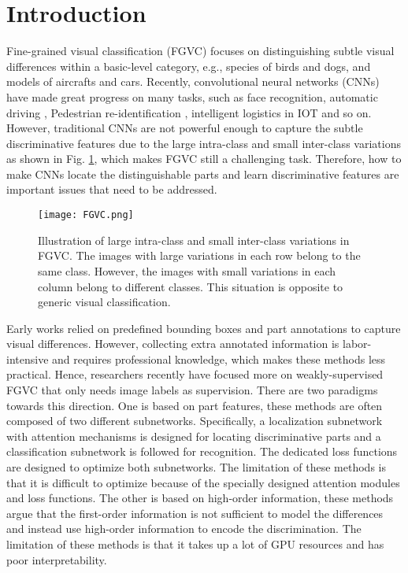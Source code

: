 \documentclass[conference]{IEEEtran}
\begin{document}
	\section{Introduction}
	Fine-grained visual classification (FGVC) focuses on distinguishing subtle visual
	differences within a basic-level category, e.g., species of birds\cite{CUB} and dogs\cite{DOG}, and models of aircrafts\cite{CRAFT} and cars\cite{CAR}.
	Recently, convolutional neural networks (CNNs) have made great progress on many tasks, such as face recognition\cite{facenet}, automatic driving \cite{self-drive},
	Pedestrian re-identification \cite{Part-Pool}, intelligent logistics in IOT and so on.
	However, traditional CNNs are not powerful enough to capture the subtle discriminative features due to the large intra-class and small inter-class variations as shown in Fig. \ref{fig:fgvc}, which makes FGVC still a challenging task. Therefore, how to make CNNs locate the distinguishable parts and learn discriminative features are important issues that need to be addressed.
	\begin{figure}[htbp]
		\centerline{\texttt{[image: FGVC.png]}}
		\caption{Illustration of large intra-class and small inter-class variations in FGVC. The images with large variations in each row belong to the same class. However, the images with small variations in each column belong to different classes. This situation is opposite to generic visual classification.}
		\label{fig:fgvc}
	\end{figure}
	Early works \cite{Part-RCNN}\cite{Deep-LAC}\cite{Part-SCNN}\cite{Pose-Norm} relied on predefined bounding boxes and part annotations to capture visual differences. However, collecting extra annotated information is labor-intensive and requires professional knowledge, which makes these methods less practical. Hence, researchers recently have focused more on weakly-supervised FGVC that only needs image labels as supervision. There are two paradigms towards this direction. One is based on part features, these methods  \cite{RA-CNN}\cite{FDL}\cite{NTS}\cite{MGE}\cite{S3N} are often composed of two different subnetworks. Specifically, a localization subnetwork with attention mechanisms is designed for locating discriminative parts and a classification subnetwork is followed for recognition. The dedicated loss functions are designed to optimize both subnetworks. The limitation of these methods is that it is difficult to optimize because of the specially designed attention modules and loss functions.
	The other is  based on high-order information,
	these methods \cite{BCNN}\cite{Compact-BCNN}\cite{iSQRT-COV}\cite{HCNN}\cite{Low-Rank} argue that the first-order information is not sufficient to model the differences and instead use high-order information to encode the discrimination. The limitation of these methods is that it takes up a lot of GPU resources and has poor interpretability.
	
\end{document}
